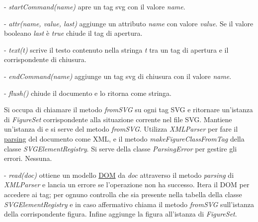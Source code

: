 \begin{elencopuntato}[\subsubsecindent]
\item[-]  \textit{startCommand(name)} apre un tag svg con il valore \textit{name}. 
\item[-]  \textit{attr(name, value, last)} aggiunge un attributo \textit{name} con valore \textit{value}. Se il valore booleano \textit{last} \`e \textit{true} chiude il tag di apertura.
\item[-]  \textit{text(t)} scrive il testo contenuto nella stringa \textit{t} tra un tag di apertura e il corrispondente di chiusura.
\item[-]  \textit{endCommand(name)} aggiunge un tag svg di chiusura con il valore \textit{name}.
\item[-]  \textit{flush()} chiude il documento e lo ritorna come stringa.
\end{elencopuntato}


Si occupa di chiamare il metodo \textit{fromSVG} su ogni tag SVG e ritornare un'istanza di \textit{FigureSet} corrispondente alla situazione corrente nel file SVG.
Mantiene un'istanza di  e si serve del metodo \textit{fromSVG}.
Utilizza \textit{XMLParser} per fare il \underline{parsing} del documento come XML, e il metodo \textit{makeFigureClassFromTag} della classe \textit{SVGElementRegistry}.
Si serve della classe \textit{ParsingError} per gestire gli errori.
Nessuna.
\begin{elencopuntato}[\subsubsecindent]
\item[-]  \textit{read(doc)} ottiene un modello \underline{DOM} da \textit{doc} attraverso il metodo \textit{parsing} di \textit{XMLParser} e lancia un errore se l'operazione non ha successo. Itera il DOM per accedere ai tag; per ognuno controlla che sia presente nella tabella della classe \textit{SVGElementRegistry} e in caso affermativo chiama il metodo \textit{fromSVG} sull'istanza della corrispondente figura. Infine aggiunge la figura all'istanza di \textit{FigureSet}.
\end{elencopuntato}

